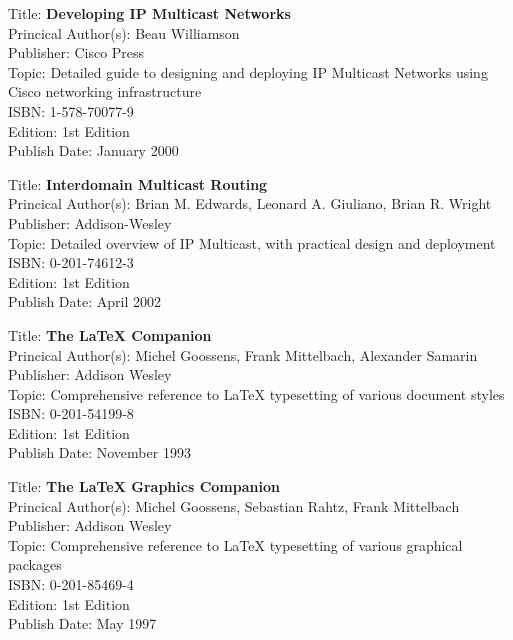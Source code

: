Title: 	\textbf{Developing IP Multicast Networks}	\\
Princical Author(s): 	Beau Williamson  \\
Publisher:	Cisco Press	\\	
Topic:		Detailed guide to designing and deploying IP Multicast Networks using Cisco networking infrastructure \\
ISBN:			1-578-70077-9 \\
Edition:		1st Edition \\
Publish Date:		January 2000


Title: 	\textbf{Interdomain Multicast Routing}	\\
Princical Author(s): 	Brian M. Edwards, Leonard A. Giuliano, Brian R. Wright\\
Publisher:	Addison-Wesley	\\	
Topic:		Detailed overview of IP Multicast, with practical design and deployment \\
ISBN:			0-201-74612-3 \\
Edition:		1st Edition \\
Publish Date:		April 2002


Title: 	\textbf{The \textrm{\LaTeX}  Companion}	\\
Princical Author(s): 	Michel Goossens, Frank Mittelbach, Alexander Samarin  \\
Publisher:	Addison Wesley	\\	
Topic:		Comprehensive reference to \textrm{\LaTeX} typesetting of various document styles \\
ISBN:			0-201-54199-8 \\
Edition:		1st Edition \\
Publish Date:		November 1993


Title: 	\textbf{The \textrm{\LaTeX} Graphics Companion}	\\
Princical Author(s): 	Michel Goossens, Sebastian Rahtz, Frank Mittelbach  \\
Publisher:	Addison Wesley	\\	
Topic:		Comprehensive reference to \textrm{\LaTeX} typesetting of various graphical packages \\
ISBN:			0-201-85469-4 \\
Edition:		1st Edition \\
Publish Date:		May 1997

